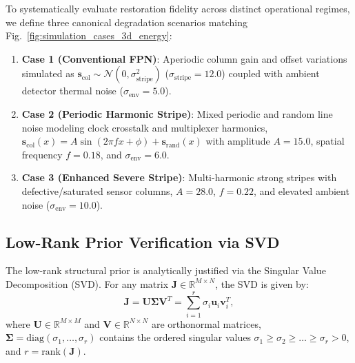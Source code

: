 To systematically evaluate restoration fidelity across distinct operational regimes, we define three canonical degradation scenarios matching Fig.~\ref{fig:simulation_cases_3d_energy}:
\begin{enumerate}
    \item \textbf{Case 1 (Conventional FPN)}: Aperiodic column gain and offset variations simulated as $\mathbf{s}_{\mathrm{col}} \sim \mathcal{N}(0, \sigma_{\mathrm{stripe}}^2)$ ($\sigma_{\mathrm{stripe}} = 12.0$) coupled with ambient detector thermal noise ($\sigma_{\mathrm{env}} = 5.0$).
    \item \textbf{Case 2 (Periodic Harmonic Stripe)}: Mixed periodic and random line noise modeling clock crosstalk and multiplexer harmonics, $\mathbf{s}_{\mathrm{col}}(x) = A \sin(2\pi f x + \phi) + \mathbf{s}_{\mathrm{rand}}(x)$ with amplitude $A = 15.0$, spatial frequency $f = 0.18$, and $\sigma_{\mathrm{env}} = 6.0$.
    \item \textbf{Case 3 (Enhanced Severe Stripe)}: Multi-harmonic strong stripes with defective/saturated sensor columns, $A = 28.0$, $f = 0.22$, and elevated ambient noise ($\sigma_{\mathrm{env}} = 10.0$).
\end{enumerate}

\subsection{Low-Rank Prior Verification via SVD}
\label{subsec:svd_lowrank}
The low-rank structural prior is analytically justified via the Singular Value Decomposition (SVD). For any matrix $\mathbf{J} \in \mathbb{R}^{M \times N}$, the SVD is given by:
\begin{equation}
\label{eq:svd_expansion}
\mathbf{J} = \mathbf{U} \mathbf{\Sigma} \mathbf{V}^T = \sum_{i=1}^r \sigma_i \mathbf{u}_i \mathbf{v}_i^T,
\end{equation}
where $\mathbf{U} \in \mathbb{R}^{M \times M}$ and $\mathbf{V} \in \mathbb{R}^{N \times N}$ are orthonormal matrices, $\mathbf{\Sigma} = \mathrm{diag}(\sigma_1, \dots, \sigma_r)$ contains the ordered singular values $\sigma_1 \ge \sigma_2 \ge \dots \ge \sigma_r > 0$, and $r = \mathrm{rank}(\mathbf{J})$.

